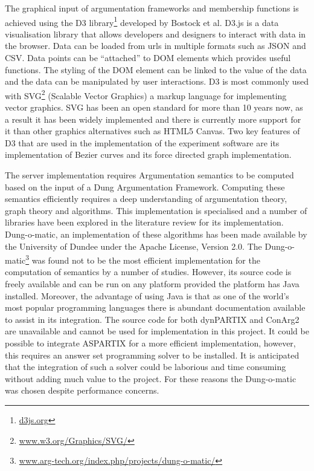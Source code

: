The graphical input of argumentation frameworks and membership functions is achieved using the  D3 library\footnote{\url{d3js.org}} developed by Bostock et al.\cite{2011-d3} D3.js is a data visualisation library that allows developers and designers to interact with data in the browser. Data can be loaded from urls in multiple formats such as JSON and CSV. Data points can be ``attached'' to DOM elements which provides useful functions. The styling of the DOM element can be linked to the value of the data and the data can be manipulated by user interactions. D3 is most commonly used with SVG\footnote{\url{www.w3.org/Graphics/SVG/}} (Scalable Vector Graphics) a markup language for implementing vector graphics. SVG has been an open standard for more than 10 years now, as a result it has been widely implemented and there is currently more support for it than other graphics alternatives such as HTML5 Canvas. Two key features of D3 that are used in the implementation of the experiment software are its implementation of Bezier curves and its force directed graph implementation.

The server implementation requires Argumentation semantics to be computed based on the input of a Dung Argumentation Framework. Computing these semantics efficiently requires a deep understanding of argumentation theory, graph theory and algorithms. This implementation is specialised and a number of libraries have been explored in the literature review for its implementation. Dung-o-matic, an implementation of these algorithms has been made available by the University of Dundee under the Apache License, Version 2.0. The Dung-o-matic\footnote{\url{www.arg-tech.org/index.php/projects/dung-o-matic/}} was found not to be the most efficient implementation for the computation of semantics by a number of studies. However, its source code is freely available and can be run on any platform provided the platform has Java installed. Moreover, the advantage of using Java is that as one of the world's most popular programming languages there is abundant documentation available to assist in its integration. The source code for both dynPARTIX and ConArg2 are unavailable and cannot be used for implementation in this project. It could be possible to integrate ASPARTIX for a more efficient implementation, however, this requires an answer set programming solver to be installed. It is anticipated that the integration of such a solver could be laborious and time consuming without adding much value to the project. For these reasons the Dung-o-matic was chosen despite performance concerns.

